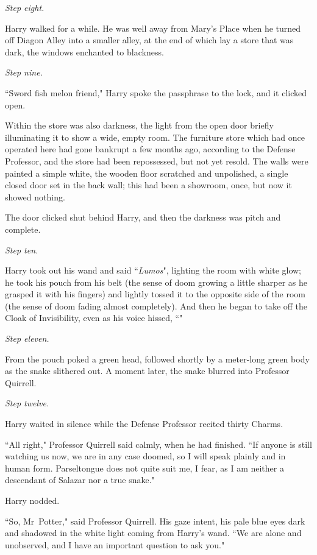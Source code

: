 \emph{Step eight.}

Harry walked for a while. He was well away from Mary's Place when he turned off Diagon Alley into a smaller alley, at the end of which lay a store that was dark, the windows enchanted to blackness.

\emph{Step nine.}

``Sword fish melon friend," Harry spoke the passphrase to the lock, and it clicked open.

Within the store was also darkness, the light from the open door briefly illuminating it to show a wide, empty room. The furniture store which had once operated here had gone bankrupt a few months ago, according to the Defense Professor, and the store had been repossessed, but not yet resold. The walls were painted a simple white, the wooden floor scratched and unpolished, a single closed door set in the back wall; this had been a showroom, once, but now it showed nothing.

The door clicked shut behind Harry, and then the darkness was pitch and complete.

\emph{Step ten.}

Harry took out his wand and said ``\emph{Lumos}", lighting the room with white glow; he took his pouch from his belt (the sense of doom growing a little sharper as he grasped it with his fingers) and lightly tossed it to the opposite side of the room (the sense of doom fading almost completely). And then he began to take off the Cloak of Invisibility, even as his voice hissed, ``"

\emph{Step eleven.}

From the pouch poked a green head, followed shortly by a meter-long green body as the snake slithered out. A moment later, the snake blurred into Professor Quirrell.

\emph{Step twelve.}

Harry waited in silence while the Defense Professor recited thirty Charms.

``All right," Professor Quirrell said calmly, when he had finished. ``If anyone is still watching us now, we are in any case doomed, so I will speak plainly and in human form. Parseltongue does not quite suit me, I fear, as I am neither a descendant of Salazar nor a true snake."

Harry nodded.

``So, Mr~Potter," said Professor Quirrell. His gaze intent, his pale blue eyes dark and shadowed in the white light coming from Harry's wand. ``We are alone and unobserved, and I have an important question to ask you."

